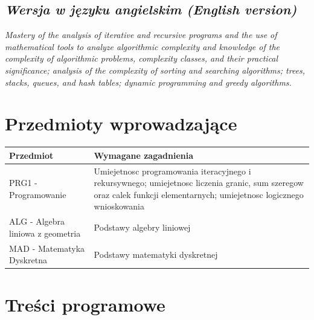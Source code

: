 \documentclass[12pt, a4paper]{article}
\newcommand{\thdrule}{\noalign{\global\setlength{\extrarowheight}{0pt}}}
\newcommand{\thdend}{\noalign{\global\setlength{\extrarowheight}{3pt}}}
\begin{document}
\subsection*{\textit{Wersja w języku angielskim (English version)}}

\textit{Mastery of the analysis of iterative and recursive programs and the use of mathematical tools to analyze algorithmic complexity and knowledge of the complexity of algorithmic problems, complexity classes, and their practical significance; analysis of the complexity of sorting and searching algorithms; trees, stacks, queues, and hash tables; dynamic programming and greedy algorithms.}


\section{Przedmioty wprowadzające}

{\scriptsize
\begin{tabularx}{\textwidth}{m{5cm}Y}
\thdrule\toprule
{} {\color{white}\textbf{Przedmiot}} & {\color{white}\textbf{Wymagane zagadnienia}} \\
\midrule\thdend
   PRG1 - Programowanie & Umiejetnosc programowania iteracyjnego i rekursywnego; umiejetnosc liczenia granic, sum szeregow oraz calek funkcji elementarnych; umiejetnosc logicznego wnioskowania \\
   ALG - Algebra liniowa z geometria & Podstawy algebry liniowej \\
   MAD - Matematyka Dyskretna & Podstawy matematyki dyskretnej \\
\bottomrule
\end{tabularx}}

\section{Treści programowe}
\end{document}
